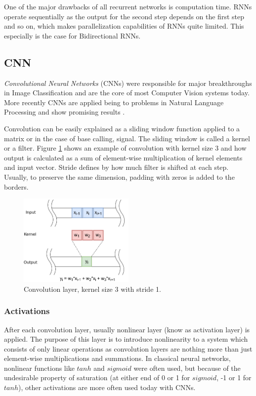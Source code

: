 \documentclass[times, utf8, diplomski, numeric, english]{fer}
\begin{document}
One of the major drawbacks of all recurrent networks is computation time. RNNs operate sequentially as the output for the second step depends on the first step and so on, which makes parallelization capabilities of RNNs quite limited. This especially is the case for Bidirectional RNNs.

\subsection{CNN}

\textit{Convolutional Neural Networks }(CNNs) were responsible for major breakthroughs in Image Classification and are the core of most Computer Vision systems today. More recently CNNs are applied being to problems in Natural Language Processing and show promising results \cite{BYTENET}\cite{facebook}.

Convolution can be easily explained as a sliding window function applied to a matrix or in the case of base calling, signal. The sliding window is called a kernel or a filter. Figure \ref{fg:convolution} shows an example of convolution with kernel size 3 and how output is calculated as a sum of element-wise multiplication of kernel elements and input vector. Stride defines by how much filter is shifted at each step. Usually, to preserve the same dimension, padding with zeros is added to the borders. 

\begin{figure}[H]
	\begin{center}
		\includegraphics[width=0.5\textwidth]{./imgs/convolution.png}
		\caption{Convolution layer, kernel size 3 with stride 1.}
		\label{fg:convolution}
	\end{center}
\end{figure}


\subsubsection{Activations}
After each convolution layer, usually nonlinear layer (know as activation layer) is applied. The purpose of this layer is to introduce nonlinearity to a system which consists of only linear operations as convolution layers are nothing more than just element-wise multiplications and summations. In classical neural networks, nonlinear functions like $ tanh $ and $ sigmoid $ were often used, but because of the undesirable property of saturation (at either end of 0 or 1 for $ sigmoid $, -1 or 1 for $ tanh $), other activations are more often used today with CNNs. 
\end{document}
